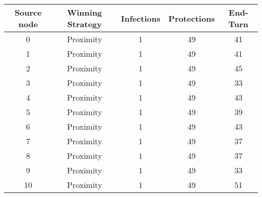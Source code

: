 \documentclass[results.tex]{subfiles}
\begin{document}
    \begin{center}
        \begin{tabular}{| c || c | c | c | c |}
            \hline
            {\bfseries Source node} & {\bfseries Winning Strategy} & {\bfseries Infections} & {\bfseries Protections}
            & {\bfseries End-Turn}
            \\  %
            \hline\hline
            0                       & Proximity                    & 1                      & 49                      & 41                   \\
            \hline
            1                       & Proximity                    & 1                      & 49                      & 41                   \\
            \hline
            2                       & Proximity                    & 1                      & 49                      & 45                   \\
            \hline
            3                       & Proximity                    & 1                      & 49                      & 33                   \\
            \hline
            4                       & Proximity                    & 1                      & 49                      & 43                   \\
            \hline
            5                       & Proximity                    & 1                      & 49                      & 39                   \\
            \hline
            6                       & Proximity                    & 1                      & 49                      & 43                   \\
            \hline
            7                       & Proximity                    & 1                      & 49                      & 37                   \\
            \hline
            8                       & Proximity                    & 1                      & 49                      & 37                   \\
            \hline
            9                       & Proximity                    & 1                      & 49                      & 33                   \\
            \hline
            10                      & Proximity                    & 1                      & 49                      & 51                   \\

\end{tabular}
\end{center}
\end{document}
